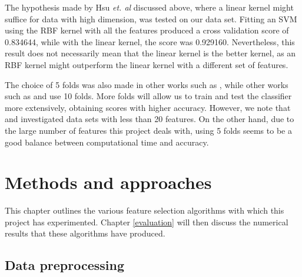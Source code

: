 \documentclass[12pt, twoside, a4paper]{report}
\begin{document}
\begin{figure}
\centering
{}
\end{figure}



The hypothesis made by Hsu \textit{et. al} discussed above, where a linear kernel might suffice for data with high dimension, was tested on our data set. Fitting an SVM using the RBF kernel with all the features produced a cross validation score of 0.834644, while with the linear kernel, the score was 0.929160. Nevertheless, this result does not necessarily mean that the linear kernel is the better kernel, as an RBF kernel might outperform the linear kernel with a different set of features.

The choice of 5 folds was also made in other works such as \cite{RefWorks:187}, while other works such as \cite{RefWorks:202} and \cite{RefWorks:212} use 10 folds. More folds will allow us to train and test the classifier more extensively, obtaining scores with higher accuracy. However, we note that \cite{RefWorks:187} and \cite{RefWorks:202} investigated data sets with less than 20 features. On the other hand, due to the large number of features this project deals with, using 5 folds seems to be a good balance between computational time and accuracy.




\chapter{Methods and approaches}
\label{methods}

This chapter outlines the various feature selection algorithms with which this project has experimented. Chapter \ref{evaluation} will then discuss the numerical results that these algorithms have produced. 

\section{Data preprocessing}
\end{document}
